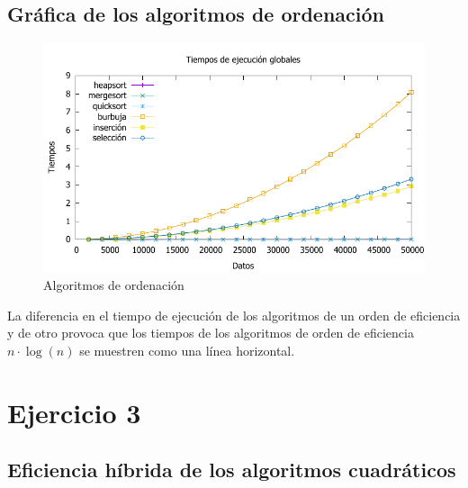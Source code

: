 \documentclass[a4paper, 11pt]{article}
\begin{document}
\subsection{Gráfica de los algoritmos de ordenación}
\begin{figure}[h] \includegraphics[width=14cm]{comparativa_global_g} \centering
	\caption{Algoritmos de ordenación} \end{figure}

La diferencia en el tiempo de ejecución de los algoritmos de un orden de eficiencia y de otro provoca que los tiempos de los algoritmos de orden de eficiencia $n \cdot \log (n)$ se muestren como una línea horizontal.

\newpage
\section{Ejercicio 3}

\subsection{Eficiencia híbrida de los algoritmos cuadráticos}
\end{document}
